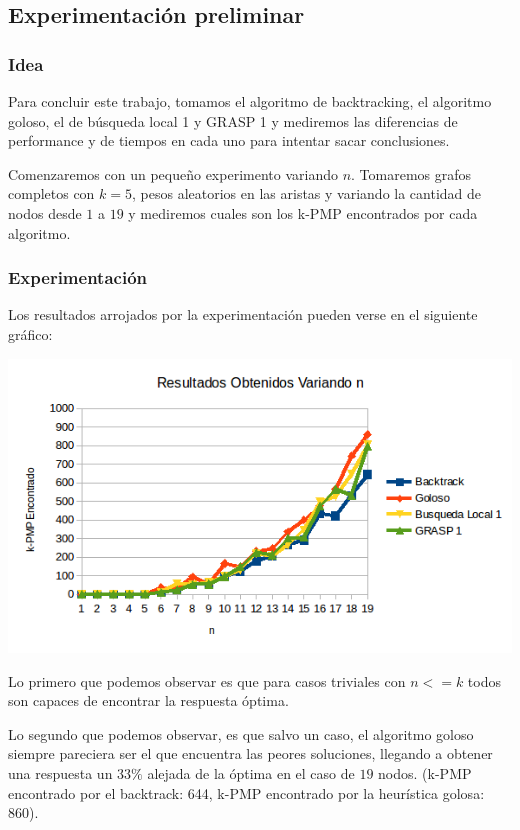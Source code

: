 \subsection{Experimentación preliminar}

\subsubsection{Idea}

Para concluir este trabajo, tomamos el algoritmo de backtracking, el algoritmo goloso, el de búsqueda local 1 y GRASP 1 y mediremos las diferencias de performance y de tiempos en cada uno para intentar sacar conclusiones.

Comenzaremos con un pequeño experimento variando $n$. Tomaremos grafos completos con $k = 5$, pesos aleatorios en las aristas y variando la cantidad de nodos desde $1$ a $19$ y mediremos cuales son los k-PMP encontrados por cada algoritmo.

\subsubsection{Experimentación}

Los resultados arrojados por la experimentación pueden verse en el siguiente gráfico:

\includegraphics[scale=0.7]{Con/performance1.png}

Lo primero que podemos observar es que para casos triviales con $n <= k$ todos son capaces de encontrar la respuesta óptima.

Lo segundo que podemos observar, es que salvo un caso, el algoritmo goloso siempre pareciera ser el que encuentra las peores soluciones, llegando a obtener una respuesta un $33 \%$ alejada de la óptima en el caso de $19$ nodos. (k-PMP encontrado por el backtrack: 644, k-PMP encontrado por la heurística golosa: 860).

